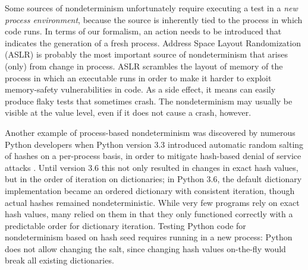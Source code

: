 Some sources of nondeterminism unfortunately require executing a test in a \emph{new
process environment}, because the source is inherently tied to the
process in which code runs.  In terms of our formalism, an
action needs to be introduced that indicates the generation of a fresh
process.  Address Space Layout Randomization (ASLR) \cite{ASLR}  is probably the most
important source of nondeterminism that arises (only) from change in
process.  ASLR scrambles the layout of memory of the process in which
an executable runs in order to make it harder to exploit memory-safety
vulnerabilities in code.  As a side effect, it
means can easily produce flaky tests that sometimes crash.  The
nondeterminism may usually be visible at the value level, even if it does not
cause a crash, however.

Another example of process-based nondeterminism was discovered by numerous Python developers when Python
version 3.3 introduced automatic random salting of hashes on a
per-process basis,
in order to mitigate hash-based denial of service attacks
\cite{denial}.  Until version 3.6 this not only resulted in changes in
exact hash values, but in the order of iteration on
dictionaries; in Python 3.6, the default dictionary implementation became an ordered dictionary with consistent iteration, though actual hashes remained nondeterministic.  While very few programs rely on exact hash values, many
relied on them in that they only functioned correctly with a
predictable order for dictionary iteration.  Testing
Python code for nondeterminism based on hash seed requires
running in a new process:  Python does not allow changing the salt, since changing hash values on-the-fly would
break all existing dictionaries.



